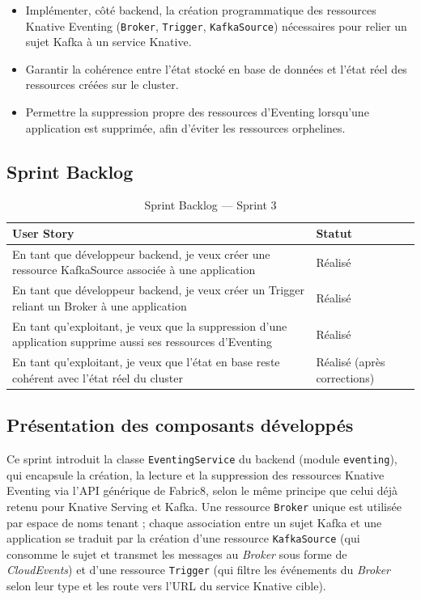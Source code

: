 \begin{itemize}
    \item Implémenter, côté backend, la création programmatique des ressources Knative Eventing (\texttt{Broker}, \texttt{Trigger}, \texttt{KafkaSource}) nécessaires pour relier un sujet Kafka à un service Knative.
    \item Garantir la cohérence entre l'état stocké en base de données et l'état réel des ressources créées sur le cluster.
    \item Permettre la suppression propre des ressources d'Eventing lorsqu'une application est supprimée, afin d'éviter les ressources orphelines.
\end{itemize}

\subsection{Sprint Backlog}

\begin{table}[!ht]
\begin{center}
     \begin{tabular}{|l{11cm}|l{3cm}|}
     \hline
     \textbf{User Story} & \textbf{Statut} \\
     \hline
     En tant que développeur backend, je veux créer une ressource KafkaSource associée à une application & Réalisé \\
     \hline
     En tant que développeur backend, je veux créer un Trigger reliant un Broker à une application & Réalisé \\
     \hline
     En tant qu'exploitant, je veux que la suppression d'une application supprime aussi ses ressources d'Eventing & Réalisé \\
     \hline
     En tant qu'exploitant, je veux que l'état en base reste cohérent avec l'état réel du cluster & Réalisé (après corrections) \\
     \hline
     \end{tabular}
     \caption{Sprint Backlog — Sprint 3}
     \label{tab:sb-sprint3}
     \end{center}
\end{table}

\subsection{Présentation des composants développés}

Ce sprint introduit la classe \texttt{EventingService} du backend (module \texttt{eventing}), qui encapsule la création, la lecture et la suppression des ressources Knative Eventing via l'API générique de Fabric8, selon le même principe que celui déjà retenu pour Knative Serving et Kafka. Une ressource \texttt{Broker} unique est utilisée par espace de noms tenant ; chaque association entre un sujet Kafka et une application se traduit par la création d'une ressource \texttt{KafkaSource} (qui consomme le sujet et transmet les messages au \textit{Broker} sous forme de \textit{CloudEvents}) et d'une ressource \texttt{Trigger} (qui filtre les événements du \textit{Broker} selon leur type et les route vers l'URL du service Knative cible).


